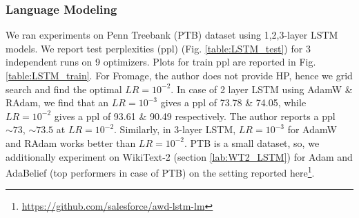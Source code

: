 \begin{table}[h]
    \begin{center}
    \vspace{2mm}
    \caption{Top-1 accuracy of ResNet18 on ImageNet. \textdagger\  is reported in \cite{chen_closing_2020}, and  \textdaggerdbl\  is reported in \cite{liu_variance_2020}} 
    \label{table:Imagenet Resnet-18 results}
    \end{center}
\end{table}









\subsubsection{Language Modeling}
\label{lab:Language_modling}
We ran experiments on Penn Treebank (PTB) dataset \cite{PTB} using 1,2,3-layer LSTM models. We report test perplexities (ppl) (Fig. \ref{table:LSTM_test}) for 3 independent runs on 9 optimizers. Plots for train ppl are reported in Fig. \ref{table:LSTM_train}. For Fromage, the author does not provide HP, hence we grid search and find the optimal $LR=10^{-2}$. In case of 2 layer LSTM using AdamW \& RAdam, we find that an $LR=10^{-3}$ gives a ppl of 73.78 \& 74.05, while $LR=10^{-2}$ gives a ppl of 93.61 \& 90.49 respectively. The author reports a ppl $\sim 73$, $\sim 73.5$ at $LR=10^{-2}$. Similarly, in 3-layer LSTM, $LR=10^{-3}$ for AdamW and RAdam works better than $LR=10^{-2}$. PTB is a small dataset, so, we additionally experiment on WikiText-2 (section \ref{lab:WT2_LSTM}) for Adam and AdaBelief (top performers in case of PTB) on the setting reported here\footnote{\href{https://github.com/salesforce/awd-lstm-lm}{https://github.com/salesforce/awd-lstm-lm}}.

